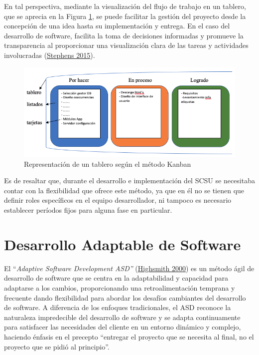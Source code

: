 \documentclass[
  12pt,
  openany]{book}
\begin{document}
En tal perspectiva, mediante la visualización del flujo de trabajo en un tablero, que se aprecia en la Figura \ref{fig:metkanban}, se puede facilitar la gestión del proyecto desde la concepción de una idea hasta su implementación y entrega. En el caso del desarrollo de software, facilita la toma de decisiones informadas y promueve la transparencia al proporcionar una visualización clara de las tareas y actividades involucradas (\protect\hyperlink{ref-stephens2015}{Stephens 2015}).

\begin{figure}

{\centering \includegraphics[width=0.7\linewidth]{images/04-metodologia/01_kanban} 

}

\caption{Representación de un tablero según el método Kanban}\label{fig:metkanban}
\end{figure}

Es de resaltar que, durante el desarrollo e implementación del SCSU se necesitaba contar con la flexibilidad que ofrece este método, ya que en él no se tienen que definir roles específicos en el equipo desarrollador, ni tampoco es necesario establecer períodos fijos para alguna fase en particular.

\hypertarget{mmasd}{%
\section{Desarrollo Adaptable de Software}\label{mmasd}}



El ``\emph{Adaptive Software Development ASD''} (\protect\hyperlink{ref-highsmith2000}{Highsmith 2000}) es un método ágil de desarrollo de software que se centra en la adaptabilidad y capacidad para adaptarse a los cambios, proporcionando una retroalimentación temprana y frecuente dando flexibilidad para abordar los desafíos cambiantes del desarrollo de software. A diferencia de los enfoques tradicionales, el ASD reconoce la naturaleza impredecible del desarrollo de software y se adapta continuamente para satisfacer las necesidades del cliente en un entorno dinámico y complejo, haciendo énfasis en el precepto ``entregar el proyecto que se necesita al final, no el proyecto que se pidió al principio''.
\end{document}
